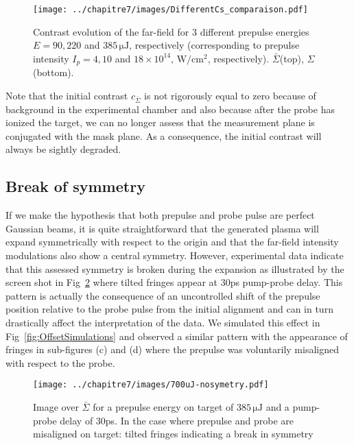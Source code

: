 \begin{figure}[H]
\centering
\texttt{[image: ../chapitre7/images/DifferentCs\_comparaison.pdf]}\\
\caption{\label{fig:DifferentCs_comparaison} Contrast evolution of the far-field for 3 different prepulse energies $E = 90,220$ and $385\,\mathrm{\mu J}$, respectively (corresponding to prepulse intensity $I_p = 4,10$ and $18\times 10^{14},\,\mathrm{W/cm^2}$, respectively). $\bar{\Sigma}$(top), $\Sigma$(bottom).}
\end{figure}

\noindent Note that the initial contrast $c_{\bar{\Sigma}}$ is not rigorously equal to zero because of background in the experimental chamber and also because after the probe has ionized the target, we can no longer assess that the measurement plane is conjugated with the mask plane. As a consequence, the initial contrast will always be sightly degraded. 



\subsection{Break of symmetry}\label{subsubsection:Break of symetry}

If we make the hypothesis that both prepulse and probe pulse are perfect Gaussian beams, it is quite straightforward that the generated plasma will expand symmetrically with respect to the origin and that the far-field intensity modulations also show a central symmetry. However, experimental data indicate that this assessed symmetry is broken during the expansion as illustrated by the screen shot in Fig~\ref{fig:700uJ-nosymetry} where tilted fringes appear at $30$ps pump-probe delay.
This pattern is actually the consequence of an uncontrolled shift of the prepulse position relative to the probe pulse from the initial alignment and can in turn drastically affect the interpretation of the data. We simulated this effect in Fig~\ref{fig:OffsetSimulations} and observed a similar pattern with the appearance of fringes in sub-figures (c) and (d) where the prepulse was voluntarily misaligned with respect to the probe. 


\begin{figure}[H]
\centering
\texttt{[image: ../chapitre7/images/700uJ-nosymetry.pdf]}\\
\caption{\label{fig:700uJ-nosymetry} Image over $\bar{\Sigma}$ for a prepulse energy on target of $385\,\mathrm{\mu J}$ and a pump-probe delay of 30ps. In the case where prepulse and probe are misaligned on target: tilted fringes indicating a break in symmetry}
\end{figure}


